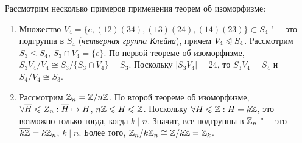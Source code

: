 \begin{example} Рассмотрим несколько примеров применения теорем об изоморфизме:
	\begin{enumerate}
		\item Множество $V_4 = \{e, (12)(34), (13)(24), (14)(23)\} \subset S_4$ "--- это подгруппа в $S_4$ (\textit{четверная группа Клейна}), причем $V_4 \trianglelefteqslant S_4$. Рассмотрим $S_3 \le S_4$, $S_3 \cap V_4 = \{e\}$. По первой теореме об изоморфизме, $S_3V_4 / V_4 \cong S_3 / \{S_3 \cap V_4\} = S_3$. Поскольку $|S_3V_4| = 24$, то $S_3V_4 = S_4$ и $S_4 / V_4 \cong S_3$.
		\item Рассмотрим $\mathbb{Z}_n = \mathbb{Z} / n\mathbb{Z}$. По второй теореме об изоморфизме, $\forall \overline{H} \leqslant Z_n: \overline{H} \mapsto H$, $n\mathbb{Z} \leqslant H \leqslant \mathbb{Z}$. Поскольку $\forall H \leqslant \mathbb{Z}: H = k\mathbb{Z}$, это возможно только тогда, когда $k\mid n$. Значит, все подгруппы в $\mathbb{Z}_n$ "--- это $\ol{k\Z} \hm= k\Z_n$, $k\mid n$. Более того, $\mathbb{Z}_n / k\mathbb{Z}_n \cong \mathbb{Z} / k\mathbb{Z} = \mathbb{Z}_k$.
	\end{enumerate}
\end{example}